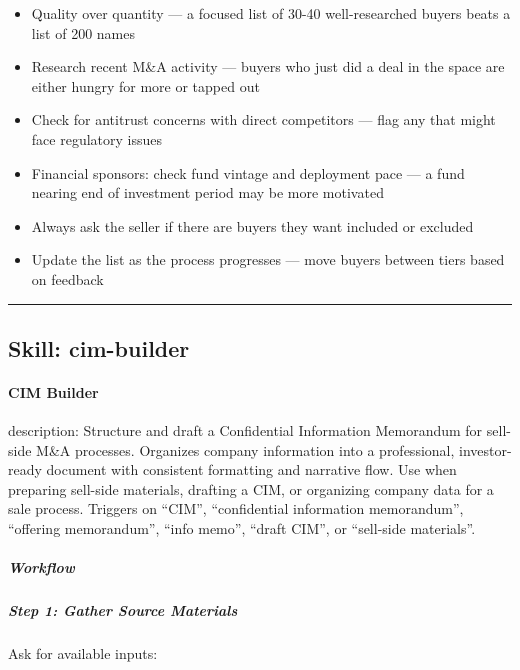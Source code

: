 \documentclass[11pt]{article}
\begin{document}
\begin{itemize}[leftmargin=*,itemsep=2pt,topsep=2pt]
\item {} Quality over quantity — a focused list of 30-40 well-researched buyers beats a list of 200 names
\item {} Research recent M\&A activity — buyers who just did a deal in the space are either hungry for more or tapped out
\item {} Check for antitrust concerns with direct competitors — flag any that might face regulatory issues
\item {} Financial sponsors: check fund vintage and deployment pace — a fund nearing end of investment period may be more motivated
\item {} Always ask the seller if there are buyers they want included or excluded
\item {} Update the list as the process progresses — move buyers between tiers based on feedback
\end{itemize}

\vspace{0.8em}\hrule\vspace{0.8em}

\subsection{Skill: cim-builder}\label{file:skills-cim-builder-SKILL.md}

\paragraph{CIM Builder}\mbox{}\par

description: Structure and draft a Confidential Information Memorandum for sell-side M\&A processes. Organizes company information into a professional, investor-ready document with consistent formatting and narrative flow. Use when preparing sell-side materials, drafting a CIM, or organizing company data for a sale process. Triggers on ``CIM'', ``confidential information memorandum'', ``offering memorandum'', ``info memo'', ``draft CIM'', or ``sell-side materials''.


\subparagraph{Workflow}\mbox{}\par

\subparagraph{Step 1: Gather Source Materials}\mbox{}\par

Ask for available inputs:
\end{document}
